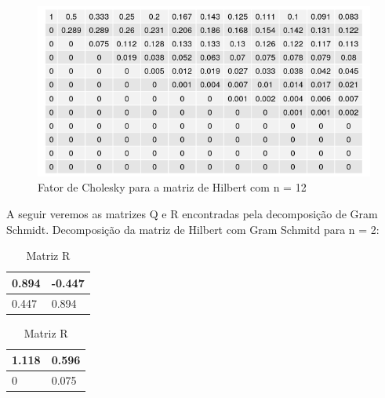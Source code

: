 \documentclass[12pt, a4paper]{article}
\begin{document}
\begin{figure}
    \centering
    \includegraphics[width = 14.5 cm]{matrizes/matriz_hilbert_CH12.png}
    \caption{Fator de Cholesky para a matriz de Hilbert com n = 12}
    \label{fig:my_label}
\end{figure}


\vspace{3mm}
\pagebreak
A seguir veremos as matrizes Q e R encontradas pela decomposição de Gram Schmidt.
Decomposição da matriz de Hilbert com Gram Schmitd para n = 2:
\begin{table}[!ht]
    \centering
\begin{minipage}[t]{0.48\linewidth}\centering
\caption{Matriz Q}
\begin{tabular}{|l|l| }
\hline
0.894 & -0.447 \\
\hline
0.447 & 0.894 \\
\hline
\end{tabular}
\end{minipage}\hfill%
\begin{minipage}[t]{0.48\linewidth}\centering
\caption{Matriz R}
\label{tab:The parameters 2 }
\begin{tabular}{|l|l|}
\hline
1.118 & 0.596 \\
\hline
0 & 0.075\\
\hline
\end{tabular}
\end{minipage}
\end{table}
\end{document}
